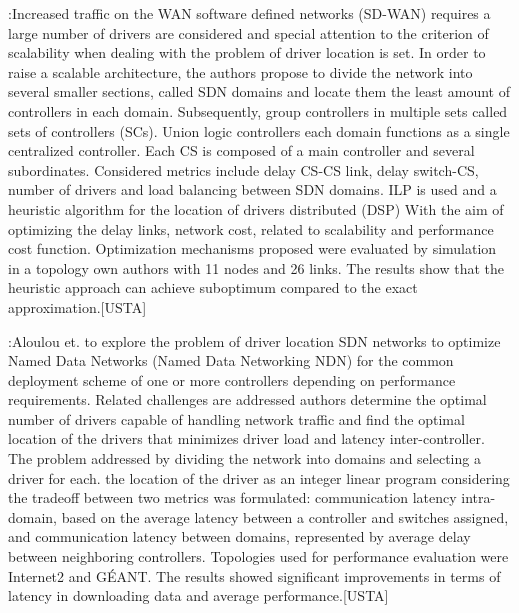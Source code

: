 \documentclass[a4paper,10pt]{article}
\begin{document}
\cite{ZhWu17}:Increased traffic on the WAN software defined networks (SD-WAN) requires a large number of drivers are considered and special attention to the criterion of scalability when dealing with the problem of driver location is set. In order to raise a scalable architecture, the authors propose to divide the network into several smaller sections, called SDN domains and locate them the least amount of controllers in each domain. Subsequently, group controllers in multiple sets called sets of controllers (SCs). Union logic controllers each domain functions as a single centralized controller. Each CS is composed of a main controller and several subordinates.
Considered metrics include delay CS-CS link, delay switch-CS, number of drivers and load balancing between SDN domains. ILP is used and a heuristic algorithm for the location of drivers distributed (DSP) With the aim of optimizing the delay links, network cost, related to scalability and performance cost function. Optimization mechanisms proposed were evaluated by simulation in a topology own authors with 11 nodes and 26 links. The results show that the heuristic approach can achieve suboptimum compared to the exact approximation.[USTA]


\cite{AlAy17}:Aloulou et. to explore the problem of driver location SDN networks to optimize Named Data Networks (Named Data Networking NDN) for the common deployment scheme of one or more controllers depending on performance requirements. Related challenges are addressed authors determine the optimal number of drivers capable of handling network traffic and find the optimal location of the drivers that minimizes driver load and latency inter-controller.
The problem addressed by dividing the network into domains and selecting a driver for each. the location of the driver as an integer linear program considering the tradeoff between two metrics was formulated: communication latency intra-domain, based on the average latency between a controller and switches assigned, and communication latency between domains, represented by average delay between neighboring controllers. Topologies used for performance evaluation were Internet2 and GÉANT. The results showed significant improvements in terms of latency in downloading data and average performance.[USTA]
\end{document}
